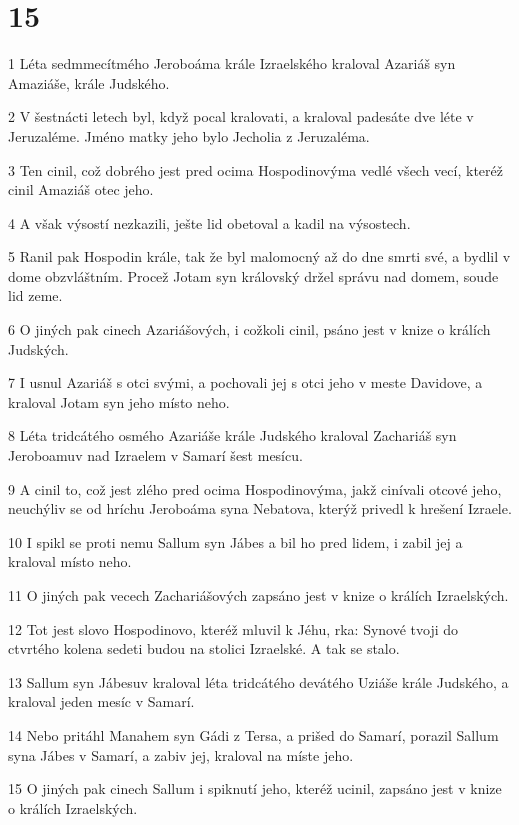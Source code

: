 \chapter{15}

\par 1 Léta sedmmecítmého Jeroboáma krále Izraelského kraloval Azariáš syn Amaziáše, krále Judského.
\par 2 V šestnácti letech byl, když pocal kralovati, a kraloval padesáte dve léte v Jeruzaléme. Jméno matky jeho bylo Jecholia z Jeruzaléma.
\par 3 Ten cinil, což dobrého jest pred ocima Hospodinovýma vedlé všech vecí, kteréž cinil Amaziáš otec jeho.
\par 4 A však výsostí nezkazili, ješte lid obetoval a kadil na výsostech.
\par 5 Ranil pak Hospodin krále, tak že byl malomocný až do dne smrti své, a bydlil v dome obzvláštním. Procež Jotam syn královský držel správu nad domem, soude lid zeme.
\par 6 O jiných pak cinech Azariášových, i cožkoli cinil, psáno jest v knize o králích Judských.
\par 7 I usnul Azariáš s otci svými, a pochovali jej s otci jeho v meste Davidove, a kraloval Jotam syn jeho místo neho.
\par 8 Léta tridcátého osmého Azariáše krále Judského kraloval Zachariáš syn Jeroboamuv nad Izraelem v Samarí šest mesícu.
\par 9 A cinil to, což jest zlého pred ocima Hospodinovýma, jakž cinívali otcové jeho, neuchýliv se od hríchu Jeroboáma syna Nebatova, kterýž privedl k hrešení Izraele.
\par 10 I spikl se proti nemu Sallum syn Jábes a bil ho pred lidem, i zabil jej a kraloval místo neho.
\par 11 O jiných pak vecech Zachariášových zapsáno jest v knize o králích Izraelských.
\par 12 Tot jest slovo Hospodinovo, kteréž mluvil k Jéhu, rka: Synové tvoji do ctvrtého kolena sedeti budou na stolici Izraelské. A tak se stalo.
\par 13 Sallum syn Jábesuv kraloval léta tridcátého devátého Uziáše krále Judského, a kraloval jeden mesíc v Samarí.
\par 14 Nebo pritáhl Manahem syn Gádi z Tersa, a prišed do Samarí, porazil Sallum syna Jábes v Samarí, a zabiv jej, kraloval na míste jeho.
\par 15 O jiných pak cinech Sallum i spiknutí jeho, kteréž ucinil, zapsáno jest v knize o králích Izraelských.
